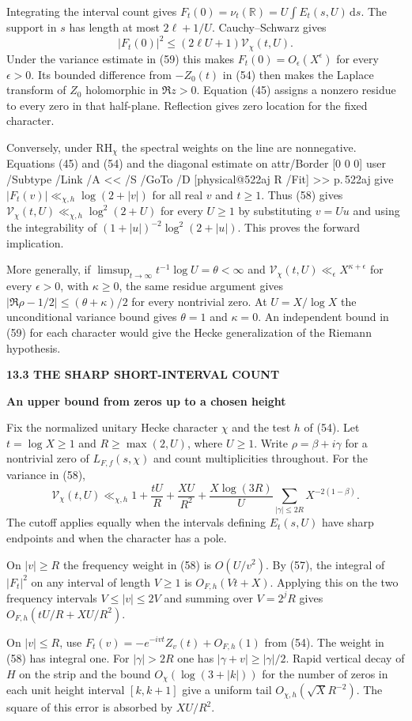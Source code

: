 \documentclass[11pt,letterpaper]{article}
\makeatletter
\newcommand{\rightmarktext}{}
\newcommand{\printfolio}{}
\newcommand{\leaf}[4]{\clearpage\gdef\printfolio{#1}\gdef\rightmarktext{#2}%
  {\small\sffamily\bfseries\color{ink}#3\par}\vspace{3pt}%
  {\LARGE\bfseries #4\par}\vspace{5pt}}
\newcommand{\R}{\mathbb R}
\newcommand{\dd}{\,\mathrm d}
\newcommand{\MusicPDFPageRef}[1]{\pdfpageref\csname physical@#1\endcsname\space\space 0 R}
\newcommand{\pagelink}[2]{\leavevmode\pdfstartlink attr{/Border [0 0 0]} user{%
  /Subtype /Link /A << /S /GoTo /D [\MusicPDFPageRef{#1} /Fit] >>}%
  {\color{ink}#2}\pdfendlink}
\newcommand{\pg}[1]{\pagelink{#1}{p.\,#1}}
\makeatother
\begin{document}
Integrating the interval count gives
$F_t(0)=\nu_t(\R)=U\int E_t(s,U)\dd s$. The support in $s$ has length
at most $2\ell+1/U$. Cauchy--Schwarz gives
\[
 |F_t(0)|^2\le(2\ell U+1)\mathcal V_\chi(t,U).
\]
Under the variance estimate in (59) this makes $F_t(0)=O_\epsilon(X^\epsilon)$
for every $\epsilon>0$. Its bounded difference from $-Z_0(t)$ in (54)
then makes the Laplace transform of $Z_0$ holomorphic in $\Re z>0$.
Equation (45) assigns a nonzero residue to every zero in that half-plane.
Reflection gives zero location for the fixed character.

Conversely, under $\mathrm{RH}_\chi$ the spectral weights on the line
are nonnegative. Equations (45) and (54) and the diagonal estimate
on \pg{522aj} give $|F_t(v)|\ll_{\chi,h}\log(2+|v|)$ for all real
$v$ and $t\ge1$. Thus (58) gives
$\mathcal V_\chi(t,U)\ll_{\chi,h}\log^2(2+U)$ for every $U\ge1$
by substituting $v=Uu$ and using the integrability of
$(1+|u|)^{-2}\log^2(2+|u|)$. This proves the forward implication.

More generally, if $\limsup_{t\to\infty}t^{-1}\log U=\theta<\infty$
and $\mathcal V_\chi(t,U)\ll_\epsilon X^{\kappa+\epsilon}$ for every
$\epsilon>0$, with $\kappa\ge0$, the same residue argument gives
$|\Re\rho-1/2|\le(\theta+\kappa)/2$ for every nontrivial zero.
At $U=X/\log X$ the unconditional variance bound gives
$\theta=1$ and $\kappa=0$. An independent bound in (59) for each
character would give the Hecke generalization of the Riemann hypothesis.

\leaf{522an}{The variance at finite height}{13.3 \quad THE SHARP SHORT-INTERVAL COUNT}{An upper bound from zeros up to a chosen height}
Fix the normalized unitary Hecke character $\chi$ and the test $h$
of (54). Let $t=\log X\ge1$ and $R\ge\max(2,U)$, where $U\ge1$.
Write $\rho=\beta+i\gamma$ for a nontrivial zero of $L_{F,f}(s,\chi)$
and count multiplicities throughout. For the variance in (58),
\[
 \mathcal V_\chi(t,U)\ll_{\chi,h}
  1+\frac{tU}{R}+\frac{XU}{R^2}
  +\frac{X\log(3R)}{U}\sum_{|\gamma|\le2R}X^{-2(1-\beta)} .
 \tag{60}
\]
The cutoff applies equally when the intervals defining $E_t(s,U)$
have sharp endpoints and when the character has a pole.

On $|v|\ge R$ the frequency weight in (58) is $O(U/v^2)$.
By (57), the integral of $|F_t|^2$ on any interval of length $V\ge1$
is $O_{F,h}(Vt+X)$. Applying this on the two frequency intervals
$V\le|v|\le2V$ and summing over $V=2^jR$ gives
$O_{F,h}(tU/R+XU/R^2)$.

On $|v|\le R$, use $F_t(v)=-e^{-ivt}Z_v(t)+O_{F,h}(1)$ from (54).
The weight in (58) has integral one. For $|\gamma|>2R$ one has
$|\gamma+v|\ge|\gamma|/2$. Rapid vertical decay of $H$ on the strip
and the bound $O_\chi(\log(3+|k|))$ for the number of zeros in each
unit height interval $[k,k+1]$ give a uniform tail $O_{\chi,h}(\sqrt X R^{-2})$.
The square of this error is absorbed by $XU/R^2$.
\end{document}
